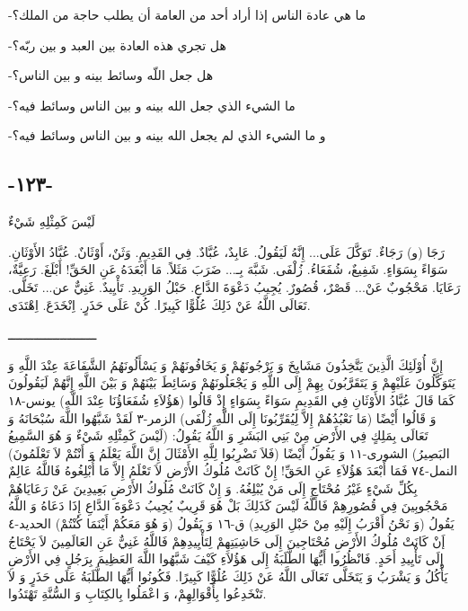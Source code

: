 \documentclass[a5paper]{article}
\begin{document}
-ما هي عادة الناس إذا أراد أحد من العامة أن يطلب حاجة من الملك؟ 

-هل تجري هذه العادة بين العبد و بين ربّه؟

-هل جعل اللّه وسائط بينه و بين الناس؟ 

-ما الشيء الذي جعل الله بينه و بين الناس وسائط فيه؟ 

-و ما الشيء الذي لم يجعل الله بينه و بين الناس وسائط فيه؟

\subsection{-١٢٣-}
لَيْسَ كَمِثْلِهِ شَيْءٌ

رَجَا (و) رَجَاءٌ. تَوَكَّلَ عَلَى... إِنَّهُ لَيَقُولُ. عَابِدٌ، عُبَّادٌ. فِي القَدِيمِ. وَثَنٌ، أَوْثَانٌ. عُبَّادُ الأَوْثَانِ. سَوَاءً بِسَوَاءٍ. شَفِيعٌ، شُفَعَاءُ. زُلْفَى. شَبَّهَ بِـ... ضَرَبَ مَثَلاً. مَا أَبْعَدَهُ عَنِ الحَقِّ! أَبْلَغَ. رَعِيَّةٌ، رَعَايَا. مَحْجُوبٌ عَنْ... قَصْرٌ، قُصُورٌ. يُجِيبُ دَعْوَةَ الدَّاعِ. حَبْلُ الوَرِيدِ. تَأْيِيدٌ. غَنِيٌّ عن... تَخَلَّى. تَعَالَى اللَّهُ عَنْ ذَلِكَ عُلُوًّا كَبِيرًا. كُنْ عَلَى حَذَرٍ. اِنْخَدَعَ. اِهْتَدَى. 

ــــــــــــــــــــــــ

إِنَّ أُوْلَئِكَ الَّذِينَ يَتَّخِذُونَ مَشَايِخَ وَ يَرْجُونَهُمْ وَ يَخَافُونَهُمْ وَ يَسْأَلُونَهُمُ الشَّفَاعَةَ عِنْدَ اللَّهِ وَ يَتَوَكَّلُونَ عَلَيْهِمْ وَ يَتَقَرَّبُونَ بِهِمْ إِلَى اللَّهِ وَ يَجْعَلُونَهُمْ وَسَائِطَ بَيْنَهُمْ وَ بَيْنَ اللَّهِ إِنَّهُمْ لَيَقُولُونَ كَمَا قَالَ عُبَّادُ الأَوْثَانِ فِي القَدِيمِ سَوَاءً بِسَوَاءٍ إِذْ قَالُوا (هَؤُلاَءِ شُفَعَاؤُنَا عِنْدَ اللَّهِ) يونس-١٨ وَ قَالُوا أَيْضًا (مَا نَعْبُدُهُمْ إِلاَّ لِيُقَرِّبُونَا إِلَى اللَّهِ زُلْفَى) الزمر-٣ لَقَدْ شَبَّهُوا اللَّهَ سُبْحَانَهُ وَ تَعَالَى بِمَلِكٍ فِي الأَرْضِ مِنْ بَنِي البَشَرِ وَ اللَّهُ يَقُولُ: (لَيْسَ كَمِثْلِهِ شَيْءٌ وَ هُوَ السَّمِيعُ البَصِيرُ) الشورى-١١ وَ يَقُولُ أَيْضًا (فَلاَ تَضْرِبُوا لِلَّهِ الأَمْثَالَ إِنَّ اللَّهَ يَعْلَمُ وَ أَنْتُمْ لاَ تَعْلَمُونَ) النمل-٧٤ فَمَا أَبْعَدَ هَؤُلاَءِ عَنِ الحَقِّ! إِنْ كَانَتْ مُلُوكُ الأَرْضِ لاَ تَعْلَمُ إِلاَّ مَا أُبْلِغُوهُ فَاللَّهُ عَالِمٌ بِكُلِّ شَيْءٍ غَيْرُ مُحْتَاجٍ إِلَى مَنْ يُبْلِغُهُ. وَ إِنْ كَانَتْ مُلُوكُ الأَرْضِ بَعِيدِينَ عَنْ رَعَايَاهُمْ مَحْجُوبِينَ فِي قُصُورِهِمْ فَاللَّهُ لَيْسَ كَذَلِكَ بَلْ هُوَ قَرِيبٌ يُجِيبُ دَعْوَةَ الدَّاعِ إِذَا دَعَاهُ وَ اللَّهُ يَقُولُ (وَ نَحْنُ أَقْرَبُ إِلَيْهِ مِنْ حَبْلِ الوَرِيدِ) ق-١٦ وَ يَقُولُ (وَ هُوَ مَعَكُمْ أَيْنَمَا كُنْتُمْ) الحديد-٤ إَنْ كَانَتْ مُلُوكُ الأَرْضِ مُحْتَاجِينَ إِلَى حَاشِيَتِهِمْ لِتَأْيِيدِهِمْ فَاللَّهُ غَنِيٌّ عَنِ العَالَمِينَ لاَ يَحْتَاجُ إِلَى تَأْيِيدِ أَحَدٍ. فَانْظُرُوا أَيُّهَا الطَّلَبَةُ إِلَى هَؤُلاَءِ كَيْفَ شَبَّهُوا اللَّهَ العَظِيمَ بِرَجُلٍ فِي الأَرْضِ يَأْكُلُ وَ يَشْرَبُ وَ يَتَخَلَّى تَعَالَى اللَّهُ عَنْ ذَلِكَ عُلُوًّا كَبِيرًا. فَكُونُوا أَيُّهَا الطَّلَبَةُ عَلَى حَذَرٍ وَ لاَ تَنْخَدِعُوا بِأَقْوَالِهِمْ، وَ اعْمَلُوا بِالكِتَابِ وَ السُّنَّةِ تَهْتَدُوا.
\end{document}
